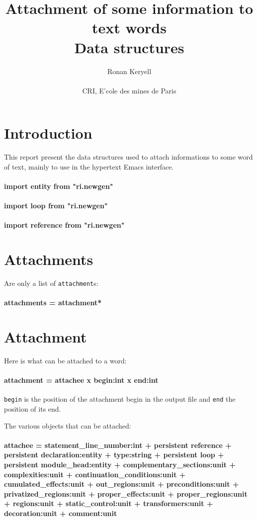 


\title{Attachment of some information to text words\\Data structures}
\author{Ronan Keryell\\
                \\
        CRI, E'cole des mines de Paris}

\newcommand{\domain}[1]{\paragraph{{#1}}}



\section*{Introduction}

This report present the data structures used to attach
informations to some word of text, mainly to use in the hypertext Emacs
interface.

\domain{import entity from "ri.newgen"}
\domain{import loop from "ri.newgen"}
\domain{import reference from "ri.newgen"}

\section{Attachments}

Are only a list of {\tt attachment}s:

\domain{attachments = attachment*}


\section{Attachment}

Here is what can be attached to a word:

\domain{attachment = attachee x begin:int x end:int}

{\tt begin} is the position of the attachment begin in the output
file and {\tt end} the position of its end.

The various objects that can be attached:
\domain{attachee = statement_line_number:int + persistent reference + persistent declaration:entity + type:string + persistent loop + persistent module_head:entity + complementary_sections:unit + complexities:unit + continuation_conditions:unit + cumulated_effects:unit + out_regions:unit + preconditions:unit + privatized_regions:unit + proper_effects:unit + proper_regions:unit + regions:unit + static_control:unit + transformers:unit + decoration:unit + comment:unit}

